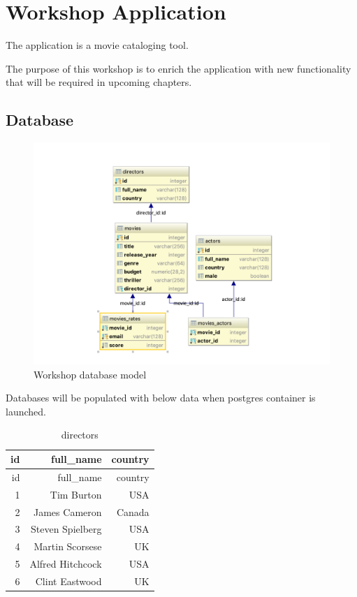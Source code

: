 \documentclass[]{book}
\begin{document}
\section{Workshop Application}\label{workshop-application}

The application is a movie cataloging tool.

The purpose of this workshop is to enrich the application with new
functionality that will be required in upcoming chapters.

\subsection{Database}\label{database}

\begin{figure}
\centering
\includegraphics{assets/database-model.png}
\caption{Workshop database model}
\end{figure}

Databases will be populated with below data when postgres container is
launched.

\begin{longtable}[]{@{}rrr@{}}
\caption{directors}\tabularnewline
\toprule
id & full\_name & country\tabularnewline
\midrule
\endfirsthead
\toprule
id & full\_name & country\tabularnewline
\midrule
\endhead
1 & Tim Burton & USA\tabularnewline
2 & James Cameron & Canada\tabularnewline
3 & Steven Spielberg & USA\tabularnewline
4 & Martin Scorsese & UK\tabularnewline
5 & Alfred Hitchcock & USA\tabularnewline
6 & Clint Eastwood & UK\tabularnewline
\bottomrule
\end{longtable}
\end{document}
